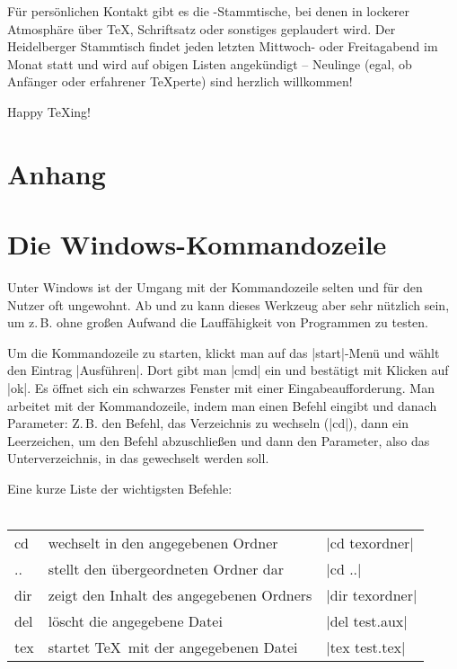\documentclass[12pt,ngerman]{scrartcl}
\begin{document}
Für persönlichen Kontakt gibt es die \DANTE-Stammtische, bei denen in lockerer Atmosphäre über \TeX, Schriftsatz oder sonstiges geplaudert wird. Der Heidelberger Stammtisch findet jeden letzten Mittwoch- oder Freitagabend im Monat statt und wird auf obigen Listen angekündigt – Neulinge (egal, ob Anfänger oder erfahrener \TeX perte) sind herzlich willkommen!
\vspace{1cm}

{\Large Happy \TeX{}ing!}

\newpage
\begin{appendix}
\section*{Anhang}
\section{Die Windows-Kommandozeile}
Unter\label{cmd} Windows ist der Umgang mit der Kommandozeile selten und für den Nutzer oft ungewohnt. Ab und zu kann dieses Werkzeug aber sehr nützlich sein, um z.\,B. ohne großen Aufwand die Lauffähigkeit von Programmen zu testen.

Um die Kommandozeile zu starten, klickt man auf das |start|-Menü und wählt den Eintrag |Ausführen|. Dort gibt man |cmd| ein und bestätigt mit Klicken auf |ok|. Es öffnet sich ein schwarzes Fenster mit einer Eingabeaufforderung. Man arbeitet mit der Kommandozeile, indem man einen Befehl eingibt und danach Parameter: Z.\,B. den Befehl, das Verzeichnis zu wechseln (|cd|), dann ein Leerzeichen, um den Befehl abzuschließen und dann den Parameter, also das Unterverzeichnis, in das gewechselt werden soll.

Eine kurze Liste der wichtigsten Befehle:
\\ \\\hfill
\begin{minipage}{\textwidth}
\begin{tabular}{lll}
  cd & wechselt in den angegebenen Ordner & |cd texordner|\\
  .. & stellt den übergeordneten Ordner dar & |cd ..|\\
  dir & zeigt den Inhalt des angegebenen Ordners & |dir texordner|\\
  del & löscht die angegebene Datei & |del test.aux|\\
  tex & startet \TeX\ mit der angegebenen Datei & |tex test.tex|\\
\end{tabular}
\end{minipage}\hfill
\end{appendix}
\end{document}

